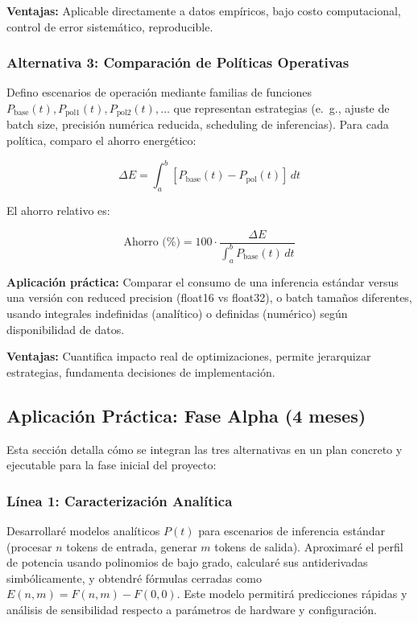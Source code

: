 \noindent\textbf{Ventajas:} Aplicable directamente a datos empíricos, bajo costo computacional, control de error sistemático, reproducible.

\subsubsection{Alternativa 3: Comparación de Políticas Operativas}

Defino escenarios de operación mediante familias de funciones $P_{\text{base}}(t), P_{\text{pol1}}(t), P_{\text{pol2}}(t), \ldots$ que representan estrategias (e.~g., ajuste de batch size, precisión numérica reducida, scheduling de inferencias). Para cada política, comparo el ahorro energético:

\begin{equation}
\Delta E = \int_a^b \left[P_{\text{base}}(t) - P_{\text{pol}}(t)\right]\,dt
\end{equation}

\noindent El ahorro relativo es:

\begin{equation}
\text{Ahorro (\%)} = 100 \cdot \frac{\Delta E}{\int_a^b P_{\text{base}}(t)\,dt}
\end{equation}

\noindent\textbf{Aplicación práctica:} Comparar el consumo de una inferencia estándar versus una versión con reduced precision (float16 vs float32), o batch tamaños diferentes, usando integrales indefinidas (analítico) o definidas (numérico) según disponibilidad de datos.

\noindent\textbf{Ventajas:} Cuantifica impacto real de optimizaciones, permite jerarquizar estrategias, fundamenta decisiones de implementación.

\subsection{Aplicación Práctica: Fase Alpha (4 meses)}

Esta sección detalla cómo se integran las tres alternativas en un plan concreto y ejecutable para la fase inicial del proyecto:

\subsubsection{Línea 1: Caracterización Analítica}

Desarrollaré modelos analíticos $P(t)$ para escenarios de inferencia estándar (procesar $n$ tokens de entrada, generar $m$ tokens de salida). Aproximaré el perfil de potencia usando polinomios de bajo grado, calcularé sus antiderivadas simbólicamente, y obtendré fórmulas cerradas como $E(n, m) = F(n, m) - F(0, 0)$. Este modelo permitirá predicciones rápidas y análisis de sensibilidad respecto a parámetros de hardware y configuración.


